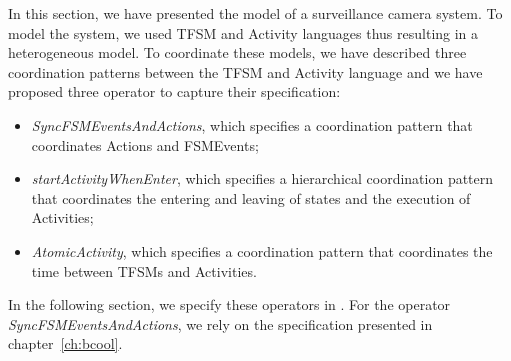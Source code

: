In this section, we have presented the model of a surveillance camera system. To model the system, we used TFSM and Activity languages thus resulting in a heterogeneous model. To coordinate these models, we have described three coordination patterns between the TFSM and Activity language and we have proposed three \bcool operator to capture their specification:
	\begin{itemize}
		\item \emph{SyncFSMEventsAndActions}, which specifies a coordination pattern that coordinates Actions and FSMEvents;
		\item \emph{startActivityWhenEnter}, which specifies a hierarchical coordination pattern that coordinates the entering and leaving of states and the execution of Activities; 
		\item \emph{AtomicActivity}, which specifies a coordination pattern that coordinates the time between TFSMs and Activities. 
	\end{itemize}
	
In the following section, we specify these operators in \bcool. For the operator \emph{SyncFSMEventsAndActions}, we rely on the specification presented in chapter~\ref{ch:bcool}. 
